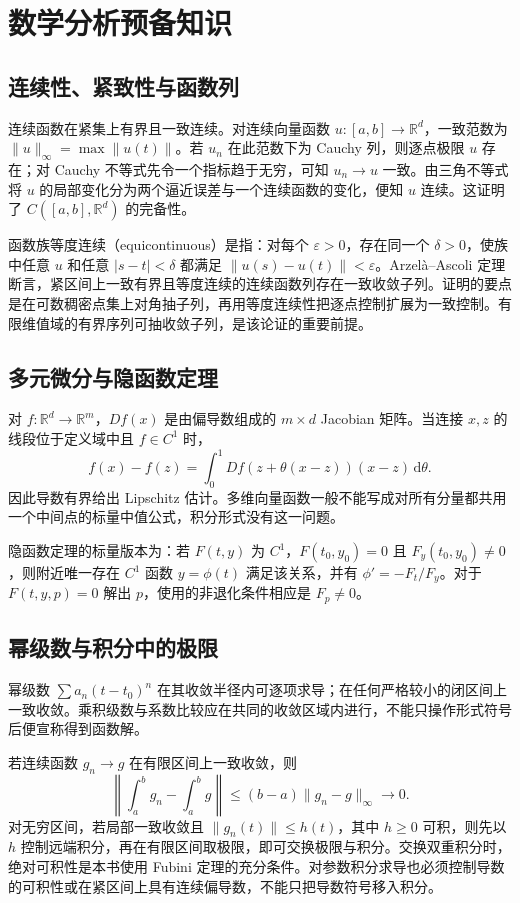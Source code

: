 \setcounter{chapter}{0} %
\chapter{数学分析预备知识}
\label{app:ode-analysis}

\section{连续性、紧致性与函数列}
连续函数在紧集上有界且一致连续。对连续向量函数 $u:[a,b]\to\mathbb R^d$，一致范数为 $\|u\|_\infty=\max\|u(t)\|$。若 $u_n$ 在此范数下为 Cauchy 列，则逐点极限 $u$ 存在；对 Cauchy 不等式先令一个指标趋于无穷，可知 $u_n\to u$ 一致。由三角不等式将 $u$ 的局部变化分为两个逼近误差与一个连续函数的变化，便知 $u$ 连续。这证明了 $C([a,b],\mathbb R^d)$ 的完备性。

函数族等度连续（equicontinuous）是指：对每个 $\varepsilon>0$，存在同一个 $\delta>0$，使族中任意 $u$ 和任意 $|s-t|<\delta$ 都满足 $\|u(s)-u(t)\|<\varepsilon$。Arzelà--Ascoli 定理断言，紧区间上一致有界且等度连续的连续函数列存在一致收敛子列。证明的要点是在可数稠密点集上对角抽子列，再用等度连续性把逐点控制扩展为一致控制。有限维值域的有界序列可抽收敛子列，是该论证的重要前提。

\section{多元微分与隐函数定理}
对 $f:\mathbb R^d\to\mathbb R^m$，$Df(x)$ 是由偏导数组成的 $m\times d$ Jacobian 矩阵。当连接 $x,z$ 的线段位于定义域中且 $f\in C^1$ 时，
\[
 f(x)-f(z)=\int_0^1Df(z+\theta(x-z))(x-z)\,\mathrm d\theta.
\]
因此导数有界给出 Lipschitz 估计。多维向量函数一般不能写成对所有分量都共用一个中间点的标量中值公式，积分形式没有这一问题。

隐函数定理的标量版本为：若 $F(t,y)$ 为 $C^1$，$F(t_0,y_0)=0$ 且 $F_y(t_0,y_0)\ne0$，则附近唯一存在 $C^1$ 函数 $y=\phi(t)$ 满足该关系，并有 $\phi'=-F_t/F_y$。对于 $F(t,y,p)=0$ 解出 $p$，使用的非退化条件相应是 $F_p\ne0$。

\section{幂级数与积分中的极限}
幂级数 $\sum a_n(t-t_0)^n$ 在其收敛半径内可逐项求导；在任何严格较小的闭区间上一致收敛。乘积级数与系数比较应在共同的收敛区域内进行，不能只操作形式符号后便宣称得到函数解。

若连续函数 $g_n\to g$ 在有限区间上一致收敛，则
\[
 \left\|\int_a^b g_n-\int_a^b g\right\|\leq(b-a)\|g_n-g\|_\infty\to0.
\]
对无穷区间，若局部一致收敛且 $\|g_n(t)\|\leq h(t)$，其中 $h\geq0$ 可积，则先以 $h$ 控制远端积分，再在有限区间取极限，即可交换极限与积分。交换双重积分时，绝对可积性是本书使用 Fubini 定理的充分条件。对参数积分求导也必须控制导数的可积性或在紧区间上具有连续偏导数，不能只把导数符号移入积分。

